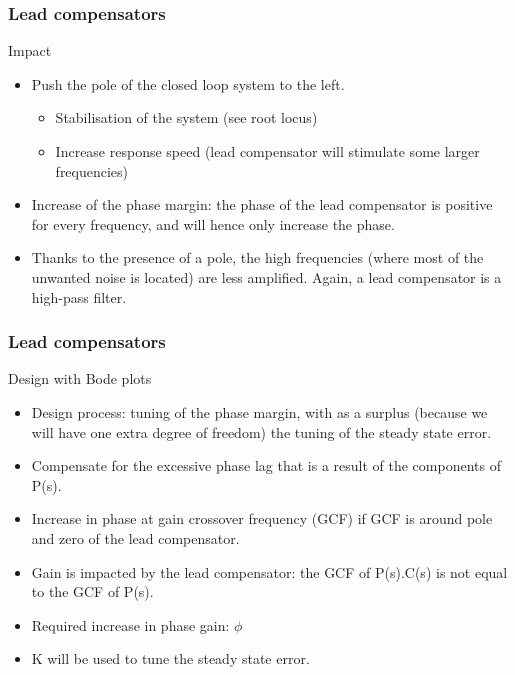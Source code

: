 \begin{frame}
\frametitle{Lead compensators}
\begin{block}{Impact}
	\begin{itemize}
	\item Push the pole of the closed loop system to the left.
	\begin{itemize}
	\item Stabilisation of the system (see root locus)
	\item Increase response speed (lead compensator will stimulate some larger frequencies)
	\end{itemize}
	\item Increase of the phase margin: the phase of the lead compensator is positive for every frequency, and will hence only increase the phase.
	\item Thanks to the presence of a pole, the high frequencies (where most of the unwanted noise is located) are less amplified. Again, a lead compensator is a high-pass filter.
	
	\end{itemize}
\end{block}
\end{frame}

\begin{frame}
\frametitle{Lead compensators}
\begin{block}{Design with Bode plots}
	\begin{itemize}
		\item Design process: tuning of the phase margin, with as a surplus (because we will have one extra degree of freedom) the tuning of the steady state error.
		\item Compensate for the excessive phase lag that is a result of the components of P(s).
		\item Increase in phase at gain crossover frequency (GCF) if GCF is around pole and zero of the lead compensator.
		\item Gain is impacted by the lead compensator: the GCF of P(s).C(s) is not equal to the GCF of P(s).
		\item Required increase in phase gain: $\phi$
		\item K will be used to tune the steady state error.
	\end{itemize}		
\end{block}
\end{frame}	

